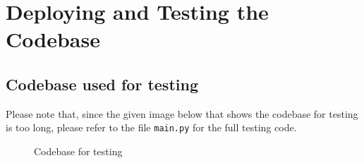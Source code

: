 \documentclass[11pt]{article}
\begin{document}
\section{Deploying and Testing the Codebase}

\subsection{Codebase used for testing}
Please note that, since the given image below that shows the codebase for testing is too long, please refer to the file \texttt{main.py} for the full testing code.

\begin{figure}[h]
    \centering
    \caption{Codebase for testing}
    \label{fig:testing_code}
\end{figure}




\end{document}
